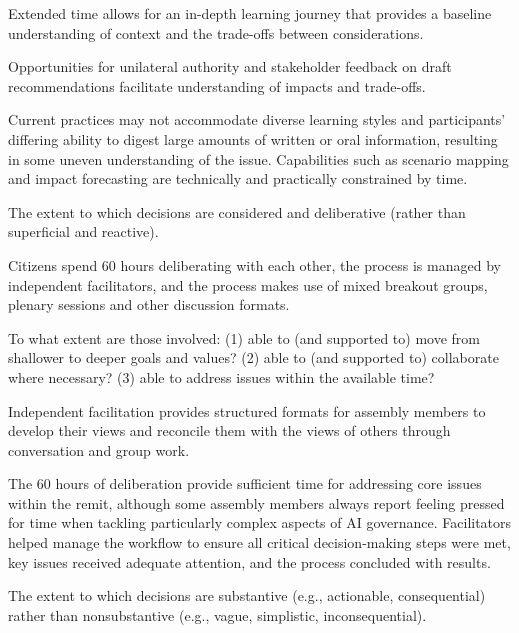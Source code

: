     Extended time allows for an in-depth learning journey that provides a baseline understanding of context and the trade-offs between considerations. 
    
    Opportunities for unilateral authority and stakeholder feedback on draft recommendations facilitate understanding of impacts and trade-offs.
    
    Current practices may not accommodate diverse learning styles and participants' differing ability to digest large amounts of written or oral information, resulting in some uneven understanding of the issue. Capabilities such as scenario mapping and impact forecasting are technically and practically constrained by time.
    
    
    \begin{describe}[grey]
        The extent to which decisions are considered and deliberative (rather than superficial and reactive).
    \end{describe}

    Citizens spend 60 hours deliberating with each other, the process is managed by independent facilitators, and the process makes use of mixed breakout groups, plenary sessions and other discussion formats.
    
    \begin{evaluate}[grey]
        To what extent are those involved: (1) able to (and supported to) move from shallower to deeper goals and values? (2) able to (and supported to) collaborate where necessary? (3) able to address issues within the available time?
    \end{evaluate}

    Independent facilitation provides structured formats for assembly members to develop their views and reconcile them with the views of others through conversation and group work.

    The 60 hours of deliberation provide sufficient time for addressing core issues within the remit, although some assembly members always report feeling pressed for time when tackling particularly complex aspects of AI governance. Facilitators helped manage the workflow to ensure all critical decision-making steps were met, key issues received adequate attention, and the process concluded with results.
    
    
    \begin{describe}[grey]
        The extent to which decisions are substantive (e.g., actionable, consequential) rather than nonsubstantive (e.g., vague, simplistic, inconsequential).
    \end{describe}

